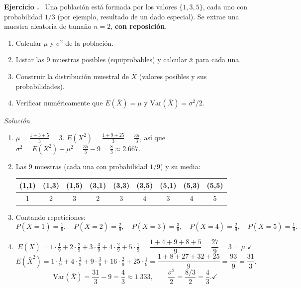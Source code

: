 \documentclass[11pt,a4paper]{article}
\newcounter{ejnum}
\newenvironment{ejercicio}{\refstepcounter{ejnum}\par\medskip\noindent\textbf{Ejercicio \theejnum.}~}{\par}
\newenvironment{solucion}{\par\noindent\textit{Solución.}~}{\par\vspace{1em}}
\begin{document}
\begin{ejercicio}
Una población está formada por los valores $\{1,3,5\}$, cada uno con probabilidad $1/3$ (por ejemplo, resultado de un dado especial). Se extrae una muestra aleatoria de tamaño $n=2$, \textbf{con reposición}.
\begin{enumerate}[label=(\alph*)]
\item Calcular $\mu$ y $\sigma^2$ de la población.
\item Listar las 9 muestras posibles (equiprobables) y calcular $\bar x$ para cada una.
\item Construir la distribución muestral de $\bar X$ (valores posibles y sus probabilidades).
\item Verificar numéricamente que $E(\bar X)=\mu$ y $\text{Var}(\bar X)=\sigma^2/2$.
\end{enumerate}
\end{ejercicio}

\begin{solucion}
\begin{enumerate}[label=(\alph*)]
\item $\mu = \frac{1+3+5}{3} = 3$. \quad $E(X^2)=\frac{1+9+25}{3}=\frac{35}{3}$, así que $\sigma^2 = E(X^2)-\mu^2 = \frac{35}{3}-9 = \frac{8}{3}\approx 2.667$.
\item Las 9 muestras (cada una con probabilidad $1/9$) y su media:
\begin{center}
\begin{tabular}{ccccccccc}
\toprule
(1,1)&(1,3)&(1,5)&(3,1)&(3,3)&(3,5)&(5,1)&(5,3)&(5,5)\\
\midrule
1&2&3&2&3&4&3&4&5\\
\bottomrule
\end{tabular}
\end{center}
\item Contando repeticiones:
$$P(\bar X=1)=\tfrac19,\quad P(\bar X=2)=\tfrac29,\quad P(\bar X=3)=\tfrac39,\quad P(\bar X=4)=\tfrac29,\quad P(\bar X=5)=\tfrac19.$$
\item
$$E(\bar X) = 1\cdot\tfrac19+2\cdot\tfrac29+3\cdot\tfrac39+4\cdot\tfrac29+5\cdot\tfrac19 = \frac{1+4+9+8+5}{9}=\frac{27}{9}=3=\mu. \checkmark$$
$$E(\bar X^2) = 1\cdot\tfrac19+4\cdot\tfrac29+9\cdot\tfrac39+16\cdot\tfrac29+25\cdot\tfrac19 = \frac{1+8+27+32+25}{9}=\frac{93}{9}=\frac{31}{3}.$$
$$\text{Var}(\bar X) = \frac{31}{3}-9 = \frac{4}{3} \approx 1.333, \qquad \frac{\sigma^2}{2} = \frac{8/3}{2}=\frac43. \checkmark$$
\end{enumerate}
\end{solucion}
\end{document}

